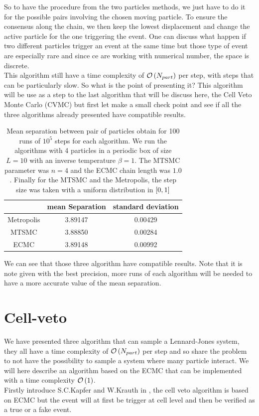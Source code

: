 \documentclass[jcp,twocolumn,longbibliography,superscriptaddress]{revtex4-2}
\newcommand{\Npart}{N_{part}}
\begin{document}
	So to have the procedure from the two particles methods, we just have to do it for the possible pairs involving the chosen moving particle. To ensure the consensus along the chain, we then keep the lowest displacement and change the active particle for the one triggering the event. One can discuss what happen if two different particles trigger an event at the same time but those type of event are especially rare and since ce are working with numerical number, the space is discrete.\\
	
	This algorithm still have a time complexity of $\OCAL \glb \Npart\grb$ per step, with steps that can be particularly slow. So what is the point of presenting it? This algorithm will be use as a step to the last algorithm that will be discuss here, the Cell Veto Monte Carlo (CVMC) but first let make a small check point and see if all the three algorithms already presented have compatible results.
	
	\begin{table}[htb]
		\begin{tabular}{|c|c|c|}
			\hline
			 & mean Separation & standard deviation\\
			 \hline
			 Metropolis & 3.89147 & 0.00429\\
			 MTSMC & 3.88850 & 0.00284\\
			 ECMC & 3.89148 & 0.00992\\
			 \hline
		\end{tabular}
		\caption{Mean separation between pair of particles obtain for 100 runs of $10^5$ steps for each algorithm. We run  the algorithms with 4 particles in a periodic box of size $L=10$ with an inverse temperature $\beta = 1$. The MTSMC parameter was $n=4$ and the ECMC chain length was $1.0$. Finally for the MTSMC and the Metropolis, the step size was taken with a uniform distribution in $\left[ 0,1 \right]$}
		\label{partialComparison}
	\end{table}
	 
	We can see that those three algorithm have compatible results. Note that it is note given with the best precision, more runs of each algorithm will be needed to have a more accurate value of  the mean separation.
	
	
	\section{Cell-veto}
	We have presented three algorithm that can sample a Lennard-Jones system, they all have a time complexity of $\OCAL\glb\Npart\grb$ per step and so share the problem to not have the possibility to sample a system where many particle interact. We will here describe an algorithm based on the ECMC that can be implemented with a time complexity $\mathcal{O}\left( 1 \right)$.\\
	Firstly introduce S.C.Kapfer and W.Krauth in \cite{KapferKrauth2016}, the cell veto algorithm  is based on ECMC but the event will at first be trigger at cell level and then be verified as a true or a fake event.
	
\end{document}
